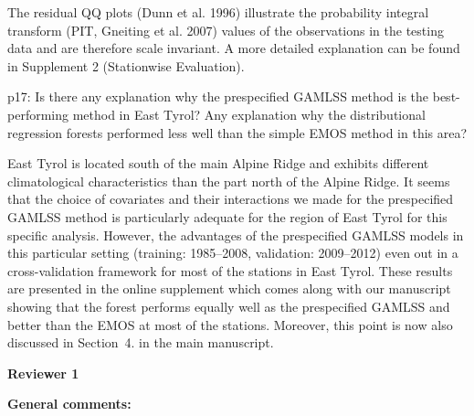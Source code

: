 \documentclass[american,foldmarks=false,noconfig]{uibklttr}
\newenvironment{review}{\fontshape{\itdefault}\fontseries{\bfdefault} \selectfont \smallskip}{\par}
\begin{document}
The residual QQ plots (Dunn et al. 1996) illustrate the probability 
integral transform (PIT, Gneiting et al. 2007) values of the observations 
in the testing data and are therefore scale invariant. A more detailed 
explanation can be found in Supplement 2 (Stationwise Evaluation).

\begin{review}
p17: Is there any explanation why the prespecified GAMLSS 
method is the best-performing method in East Tyrol? Any 
explanation why the distributional regression forests 
performed less well than the simple EMOS method in this area?
\end{review}

East Tyrol is located south of the main Alpine Ridge and exhibits different
climatological characteristics than the part north of the Alpine Ridge.  It
seems that the choice of covariates and their interactions we made for the
prespecified GAMLSS method is particularly adequate for the region of East
Tyrol for this specific analysis. However, the advantages of the prespecified
GAMLSS models in this particular setting (training: 1985--2008, validation:
2009--2012) even out in a cross-validation framework for most of the stations
in East Tyrol. These results are presented in the online supplement which comes
along with our manuscript showing that the forest performs equally well as the
prespecified GAMLSS and better than the EMOS at most of the stations.
Moreover, this point is now also discussed in Section~4. in the main manuscript.


\newpage


\textbf{\LARGE Reviewer 1}

\bigskip

\textbf{General comments:}
\end{document}
